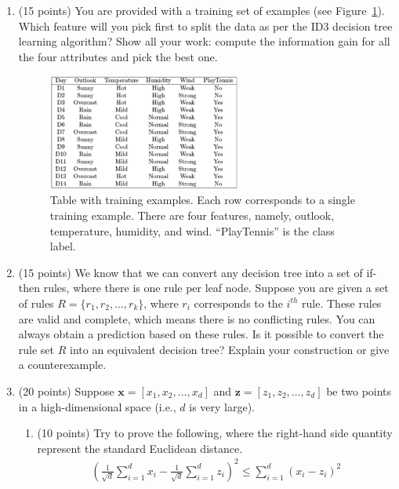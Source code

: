 \documentclass[11pt]{article}
\begin{document}
\begin{enumerate}

\item (15 points) You are provided with a training set of
examples (see Figure~\ref{fig:tree}). Which feature will you pick
first to split the data as per the ID3 decision tree learning
algorithm? Show all your work: compute the information gain for
all the four attributes and pick the best one.

\begin{figure}[ht]\label{fig:tree}
\begin{center}
    \includegraphics[width=0.6\textwidth]{tree.jpg}
    \caption{Table with training examples. Each row corresponds
    to a single training example. There are four features,
    namely, outlook, temperature, humidity, and wind.
    ``PlayTennis'' is the class label.}
\end{center}
\end{figure}

\item (15 points) We know that we can convert any decision tree
into a set of if-then rules, where there is one rule per leaf
node. Suppose you are given a set of rules $R = \{r_1, r_2,
\dots, r_k\}$, where $r_i$ corresponds to the $i^{th}$ rule.
{\color{red} These rules are valid and complete, which means
there is no conflicting rules. You can always obtain a prediction
based on these rules.} Is it possible to convert the rule set $R$
into an equivalent decision tree? Explain your construction or
give a counterexample.


\item (20 points) Suppose $\boldsymbol x = [x_1, x_2, \dots,
x_d]$ and $\boldsymbol z = [z_1, z_2, \dots, z_d]$ be two points in
a high-dimensional space (i.e., $d$ is very large).

\begin{enumerate}
    \item (10 points) Try to prove the following, where the
    right-hand side quantity represent the standard Euclidean
    distance.
    \begin{align*}
        \left(\frac{1}{\sqrt{d}}\sum_{i=1}^d x_i - \frac{1}{\sqrt{d}} \sum_{i=1}^d z_i \right)^2 \le
        \sum_{i=1}^d \left(x_i - z_i\right)^2
    \end{align*}


\end{enumerate}
\end{enumerate}
\end{document}
